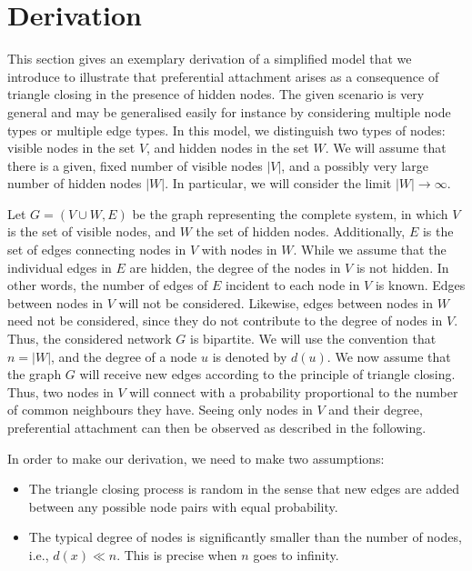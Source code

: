 \documentclass{jimis-final-en}
\begin{document}
\section{Derivation}
This section gives an exemplary derivation of a simplified model that we
introduce to illustrate that preferential 
attachment arises as a consequence of triangle closing in the presence
of hidden nodes.  The given scenario is very general and may be generalised
easily for instance by considering multiple node types or multiple edge types.  
In this model, we distinguish two types of nodes:  visible nodes in the set $V$,
and hidden nodes in the set $W$.  We will assume that there is a given,
fixed number of visible nodes $|V|$, and a possibly very large number of
hidden nodes $|W|$.  In particular, we will consider the limit $|W|
\rightarrow \infty$. 

Let $G=(V \cup W, E)$ be the graph representing the complete system, in
which $V$ is the set of visible nodes, and $W$ the set of hidden nodes.
Additionally, $E$ is the set of edges connecting nodes in $V$ with nodes
in $W$.  While we assume that the individual edges in $E$ are hidden,
the degree of the nodes in $V$ is not hidden.  In other words, the
number of edges of $E$ incident to each node in $V$ is known.  
Edges between nodes
in $V$ will not be considered. 
Likewise, edges between nodes in $W$ need not be
considered, since they do not contribute to the degree of nodes in $V$.
Thus, the considered network $G$ is bipartite.  
We will use the convention that $n = |W|$, and the degree of a node $u$ is
denoted by $d(u)$. 
We now assume that the graph $G$ will receive new edges according to the
principle of triangle closing. 
Thus, two nodes in $V$ will connect with a probability
proportional to the number of common neighbours they have.  
Seeing only nodes in $V$ and their degree, preferential attachment can then
be observed as described in the following. 

In order to make our derivation, we need to make two assumptions:
\begin{itemize}
  \item The triangle closing process is random in the sense that new
    edges are added between any possible node pairs with equal
    probability. 
  \item The typical degree of nodes is significantly smaller than the
    number of nodes, i.e., $d(x) \ll n$.  This is precise when $n$ goes
    to infinity.  
\end{itemize}
\end{document}
